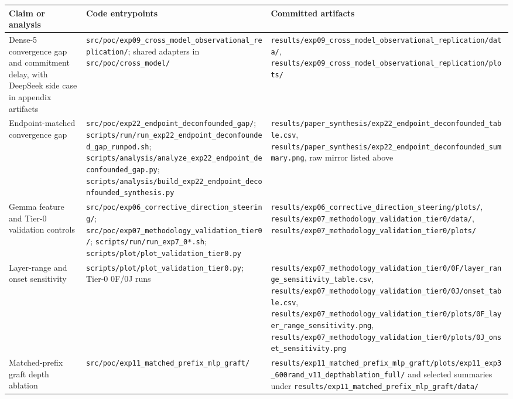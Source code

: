 \documentclass[11pt]{article}
\begin{document}
\begin{table}[t]
\centering
\small
\setlength{\tabcolsep}{3pt}
\begin{tabularx}{\linewidth}{@{}>{\raggedright\arraybackslash}X >{\raggedright\arraybackslash}X >{\raggedright\arraybackslash}X@{}}
\toprule
Claim or analysis & Code entrypoints & Committed artifacts \\
\midrule
Dense-5 convergence gap and commitment delay, with DeepSeek side case in appendix artifacts & \texttt{src/poc/exp09\_cross\_model\_observational\_replication/}; shared adapters in \texttt{src/poc/cross\_model/} & \texttt{results/exp09\_cross\_model\_observational\_replication/data/}, \texttt{results/exp09\_cross\_model\_observational\_replication/plots/} \\
Endpoint-matched convergence gap & \texttt{src/poc/exp22\_endpoint\_deconfounded\_gap/}; \texttt{scripts/run/run\_exp22\_endpoint\_deconfounded\_gap\_runpod.sh}; \texttt{scripts/analysis/analyze\_exp22\_endpoint\_deconfounded\_gap.py}; \texttt{scripts/analysis/build\_exp22\_endpoint\_deconfounded\_synthesis.py} & \texttt{results/paper\_synthesis/exp22\_endpoint\_deconfounded\_table.csv}, \texttt{results/paper\_synthesis/exp22\_endpoint\_deconfounded\_summary.png}, raw mirror listed above \\
Gemma feature and Tier-0 validation controls & \texttt{src/poc/exp06\_corrective\_direction\_steering/}; \texttt{src/poc/exp07\_methodology\_validation\_tier0/}; \texttt{scripts/run/run\_exp7\_0*.sh}; \texttt{scripts/plot/plot\_validation\_tier0.py} & \texttt{results/exp06\_corrective\_direction\_steering/plots/}, \texttt{results/exp07\_methodology\_validation\_tier0/data/}, \texttt{results/exp07\_methodology\_validation\_tier0/plots/} \\
Layer-range and onset sensitivity & \texttt{scripts/plot/plot\_validation\_tier0.py}; Tier-0 0F/0J runs & \texttt{results/exp07\_methodology\_validation\_tier0/0F/layer\_range\_sensitivity\_table.csv}, \texttt{results/exp07\_methodology\_validation\_tier0/0J/onset\_table.csv}, \texttt{results/exp07\_methodology\_validation\_tier0/plots/0F\_layer\_range\_sensitivity.png}, \texttt{results/exp07\_methodology\_validation\_tier0/plots/0J\_onset\_sensitivity.png} \\
Matched-prefix graft depth ablation & \texttt{src/poc/exp11\_matched\_prefix\_mlp\_graft/} & \texttt{results/exp11\_matched\_prefix\_mlp\_graft/plots/exp11\_exp3\_600rand\_v11\_depthablation\_full/} and selected summaries under \texttt{results/exp11\_matched\_prefix\_mlp\_graft/data/} \\

\end{tabularx}
\end{table}
\end{document}
